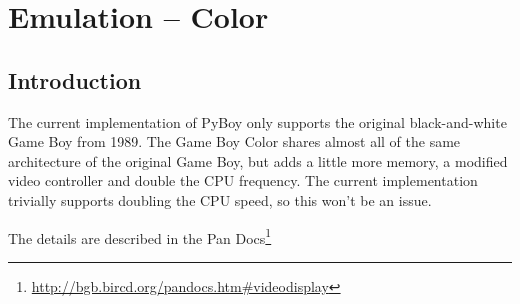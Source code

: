 \documentclass[11pt]{report} %
\begin{document}
\chapter*{Emulation -- Color}
\section*{Introduction}
The current implementation of PyBoy only supports the original black-and-white Game Boy from 1989. The Game Boy Color shares almost all of the same architecture of the original Game Boy, but adds a little more memory, a modified video controller and double the CPU frequency. The current implementation trivially supports doubling the CPU speed, so this won't be an issue.

The details are described in the Pan Docs\footnote{\url{http://bgb.bircd.org/pandocs.htm#videodisplay}}
\end{document}
